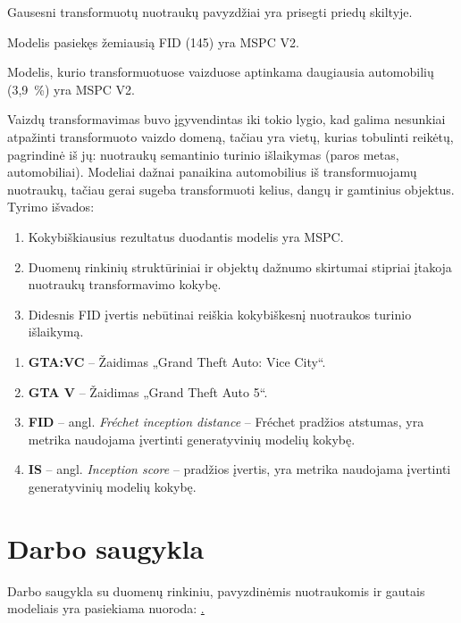 \documentclass{VUMIFPSkursinis}
\begin{document}
    Gausesni transformuotų nuotraukų pavyzdžiai yra prisegti priedų skiltyje.
    
    Modelis pasiekęs žemiausią FID (145) yra MSPC V2. 
    
    Modelis, kurio transformuotuose vaizduose aptinkama daugiausia automobilių (3,9~\%) yra MSPC V2.
    
    Vaizdų transformavimas buvo įgyvendintas iki tokio lygio, kad galima nesunkiai atpažinti transformuoto vaizdo domeną, tačiau yra vietų, kurias tobulinti reikėtų, pagrindinė iš jų: nuotraukų semantinio turinio išlaikymas (paros metas, automobiliai). Modeliai dažnai panaikina automobilius iš transformuojamų nuotraukų, tačiau gerai sugeba transformuoti kelius, dangų ir gamtinius objektus.
    Tyrimo išvados:
    \begin{enumerate}
        \item Kokybiškiausius rezultatus duodantis modelis yra MSPC.
        \item Duomenų rinkinių struktūriniai ir objektų dažnumo skirtumai stipriai įtakoja nuotraukų transformavimo kokybę.
        \item Didesnis FID įvertis nebūtinai reiškia kokybiškesnį nuotraukos turinio išlaikymą.
    \end{enumerate}

    \begin{enumerate}
        \item \textbf{GTA:VC} – Žaidimas „Grand Theft Auto: Vice City“.
        \item \textbf{GTA V} – Žaidimas „Grand Theft Auto 5“.
        \item \textbf{FID} – angl. \emph{Fréchet inception distance} – Fréchet pradžios atstumas, yra metrika naudojama įvertinti generatyvinių modelių kokybę.
        \item \textbf{IS} – angl. \emph{Inception score} – pradžios įvertis, yra metrika naudojama įvertinti generatyvinių modelių kokybę.
    \end{enumerate}
    
        

\printbibliography[heading=bibintoc]

\appendix
    \section{Darbo saugykla}
        Darbo saugykla su duomenų rinkiniu, pavyzdinėmis nuotraukomis ir gautais modeliais yra pasiekiama nuoroda: \href{https://github.com/0ksas/kursinis}.
\end{document}
